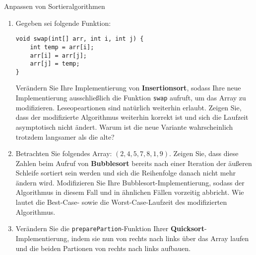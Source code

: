 \documentclass[11pt,a4paper]{article}
\begin{document}
\thispagestyle{empty}




\begin{aufgabe}{1}{Anpassen von Sortieralgorithmen}
    \begin{enumerate}
        \item Gegeben sei folgende Funktion:
        \begin{lstlisting}
void swap(int[] arr, int i, int j) {
    int temp = arr[i];
    arr[i] = arr[j];
    arr[j] = temp;
} 
        \end{lstlisting}
        Verändern Sie Ihre Implementierung von \textbf{Insertionsort}, sodass Ihre neue Implementierung ausschließlich die Funktion \texttt{swap} aufruft, um das Array zu modifizieren. Leseopeartionen sind natürlich weiterhin erlaubt.
        Zeigen Sie, dass der modifizierte Algorithmus weiterhin korrekt ist und sich die Laufzeit asymptotisch nicht ändert.
        Warum ist die neue Variante wahrscheinlich trotzdem langsamer als die alte?

        \item Betrachten Sie folgendes Array: $(2, 4, 5, 7, 8, 1, 9)$. Zeigen Sie, dass diese Zahlen beim Aufruf von \textbf{Bubble\-sort} bereits nach einer Iteration der äußeren Schleife sortiert sein werden und sich die Reihenfolge danach nicht mehr ändern wird.
        Modifizieren Sie Ihre Bubblesort-Implementierung, sodass der Algorithmus in diesem Fall und in ähnlichen Fällen vorzeitig abbricht.
        Wie lautet die Best-Case- sowie die Worst-Case-Laufzeit des modifizierten Algorithmus.

        \item Verändern Sie die \texttt{preparePartion}-Funktion Ihrer \textbf{Quicksort}-Implementierung, indem sie nun von rechts nach links über das Array laufen und die beiden Partionen von rechts nach links aufbauen.
    \end{enumerate}
\end{aufgabe}
\end{document}
